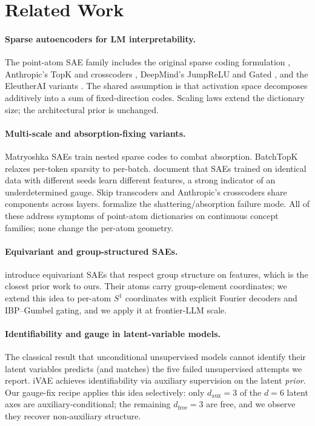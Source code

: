 \documentclass[10pt,twocolumn]{article}
\begin{document}
\section{Related Work}
\label{sec:related}

\paragraph{Sparse autoencoders for LM interpretability.}
The point-atom SAE family includes the original sparse coding formulation
\cite{makhzani2014ksparse}, Anthropic's TopK \cite{gao2024scaling} and
crosscoders \cite{lindsey2024crosscoders}, DeepMind's JumpReLU
\cite{rajamanoharan2024jumprelu} and Gated \cite{rajamanoharan2024gated}, and
the EleutherAI variants \cite{paulo2025sparse,cunningham2024sparse}. The
shared assumption is that activation space decomposes additively into a sum of
fixed-direction codes. Scaling laws \cite{gao2024scaling,templeton2024scaling}
extend the dictionary size; the architectural prior is unchanged.

\paragraph{Multi-scale and absorption-fixing variants.} Matryoshka SAEs
\cite{bussmann2025feature} train nested sparse codes to combat absorption.
BatchTopK \cite{bussmann2024batchtopk} relaxes per-token sparsity to per-batch.
\citet{paulo2025sparse} document that SAEs trained on identical data with
different seeds learn different features, a strong indicator of an underdetermined
gauge. Skip transcoders \cite{paulo2025sparse} and Anthropic's crosscoders
\cite{lindsey2024crosscoders} share components across layers. \citet{mendel2025feature}
formalize the shattering/absorption failure mode. All of these address
symptoms of point-atom dictionaries on continuous concept families; none change
the per-atom geometry.

\paragraph{Equivariant and group-structured SAEs.} \citet{khemlani2024equivariant}
introduce equivariant SAEs that respect group structure on features, which is
the closest prior work to ours. Their atoms carry group-element coordinates; we
extend this idea to per-atom $S^1$ coordinates with explicit Fourier decoders
and IBP--Gumbel gating, and we apply it at frontier-LLM scale.

\paragraph{Identifiability and gauge in latent-variable models.} The classical
result that unconditional unsupervised models cannot identify their latent
variables \cite{khemakhem2020ivae} predicts (and matches) the five failed
unsupervised attempts we report. iVAE \cite{khemakhem2020ivae} achieves
identifiability via auxiliary supervision on the latent \emph{prior}. Our
gauge-fix recipe applies this idea selectively: only $d_{\text{aux}}{=}3$ of the
$d{=}6$ latent axes are auxiliary-conditional; the remaining $d_{\text{free}}{=}3$
are free, and we observe they recover non-auxiliary structure.
\end{document}
